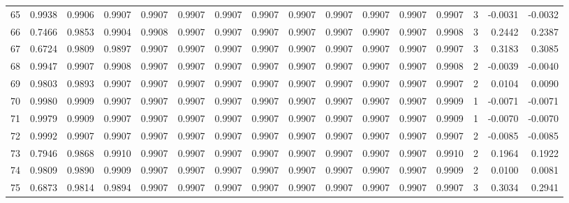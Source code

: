 \begin{tabular}{lrrrrrrrrrrrrrrr}
65  &      0.9938 &  0.9906 &  0.9907 &  0.9907 &  0.9907 &  0.9907 &  0.9907 &  0.9907 &  0.9907 &  0.9907 &   0.9907 &     0.9907 &      3 &                   -0.0031 &                    -0.0032 \\
66  &      0.7466 &  0.9853 &  0.9904 &  0.9908 &  0.9907 &  0.9907 &  0.9907 &  0.9907 &  0.9907 &  0.9907 &   0.9907 &     0.9908 &      3 &                    0.2442 &                     0.2387 \\
67  &      0.6724 &  0.9809 &  0.9897 &  0.9907 &  0.9907 &  0.9907 &  0.9907 &  0.9907 &  0.9907 &  0.9907 &   0.9907 &     0.9907 &      3 &                    0.3183 &                     0.3085 \\
68  &      0.9947 &  0.9907 &  0.9908 &  0.9907 &  0.9907 &  0.9907 &  0.9907 &  0.9907 &  0.9907 &  0.9907 &   0.9907 &     0.9908 &      2 &                   -0.0039 &                    -0.0040 \\
69  &      0.9803 &  0.9893 &  0.9907 &  0.9907 &  0.9907 &  0.9907 &  0.9907 &  0.9907 &  0.9907 &  0.9907 &   0.9907 &     0.9907 &      2 &                    0.0104 &                     0.0090 \\
70  &      0.9980 &  0.9909 &  0.9907 &  0.9907 &  0.9907 &  0.9907 &  0.9907 &  0.9907 &  0.9907 &  0.9907 &   0.9907 &     0.9909 &      1 &                   -0.0071 &                    -0.0071 \\
71  &      0.9979 &  0.9909 &  0.9907 &  0.9907 &  0.9907 &  0.9907 &  0.9907 &  0.9907 &  0.9907 &  0.9907 &   0.9907 &     0.9909 &      1 &                   -0.0070 &                    -0.0070 \\
72  &      0.9992 &  0.9907 &  0.9907 &  0.9907 &  0.9907 &  0.9907 &  0.9907 &  0.9907 &  0.9907 &  0.9907 &   0.9907 &     0.9907 &      2 &                   -0.0085 &                    -0.0085 \\
73  &      0.7946 &  0.9868 &  0.9910 &  0.9907 &  0.9907 &  0.9907 &  0.9907 &  0.9907 &  0.9907 &  0.9907 &   0.9907 &     0.9910 &      2 &                    0.1964 &                     0.1922 \\
74  &      0.9809 &  0.9890 &  0.9909 &  0.9907 &  0.9907 &  0.9907 &  0.9907 &  0.9907 &  0.9907 &  0.9907 &   0.9907 &     0.9909 &      2 &                    0.0100 &                     0.0081 \\
75  &      0.6873 &  0.9814 &  0.9894 &  0.9907 &  0.9907 &  0.9907 &  0.9907 &  0.9907 &  0.9907 &  0.9907 &   0.9907 &     0.9907 &      3 &                    0.3034 &                     0.2941 \\

\end{tabular}
